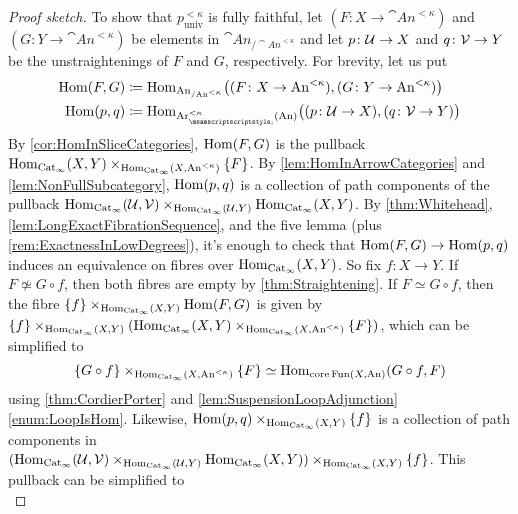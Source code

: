 \begin{proof}[Proof sketch]
	To show that $p_\mathrm{univ}^{<\kappa}$ is fully faithful, let $(F\colon X\rightarrow \cat{An}^{<\kappa})$ and $(G\colon Y\rightarrow \cat{An}^{<\kappa})$ be elements in $\cat{An}_{/\cat{An}^{<\kappa}}$ and let $p\colon \mathcal{U}\rightarrow X$ and $q\colon \mathcal{V}\rightarrow Y$ be the unstraightenings of $F$ and $G$, respectively. For brevity, let us put
	\begin{align*}
		\Hom(F,G)&\coloneqq \Hom_{\cat{An}_{/\cat{An}^{<\kappa}}}\lef((F\colon X\rightarrow \cat{An}^{<\kappa}),(G\colon Y\rightarrow \cat{An}^{<\kappa})\righ)\\
		\Hom(p,q)&\coloneqq \Hom_{\Ar_{ \pullbacksign \vphantom{^n} }^{<\kappa}(\cat{An})}\bigl((p\colon \Uu\rightarrow X),(q\colon \Vv\rightarrow Y)\bigr)
	\end{align*}
	By \cref{cor:HomInSliceCategories}, $\operatorname{Hom}(F,G)$ is the pullback $\operatorname{Hom}_{\mathrm{Cat}_\infty}\!\left(X,Y\right)\times_{\operatorname{Hom}_{\mathrm{Cat}_\infty}(X,\mathrm{An}^{<\kappa})}\{F\}$. By \cref{lem:HomInArrowCategories} and \cref{lem:NonFullSubcategory}, $\operatorname{Hom}(p,q)$ is a collection of path components of the pullback $\operatorname{Hom}_{\mathrm{Cat}_\infty}\!\left(\mathcal{U},\mathcal{V}\right)\times_{\operatorname{Hom}_{\mathrm{Cat}_\infty}(\mathcal{U},Y)}\operatorname{Hom}_{\mathrm{Cat}_\infty}\!\left(X,Y\right)$. By \cref{thm:Whitehead}, \cref{lem:LongExactFibrationSequence}, and the five lemma (plus \cref{rem:ExactnessInLowDegrees}), it's enough to check that $\operatorname{Hom}(F,G)\rightarrow \operatorname{Hom}(p,q)$ induces an equivalence on fibres over $\operatorname{Hom}_{\mathrm{Cat}_\infty}(X,Y)$. So fix $f\colon X\rightarrow Y$. If $F\not\simeq G\circ f$, then both fibres are empty by \cref{thm:Straightening}. If $F\simeq G\circ f$, then the fibre $\{f\}\times_{\operatorname{Hom}_{\mathrm{Cat}_\infty}(X,Y)}\operatorname{Hom}\!\left(F,G\right)$ is given by $\{f\}\times_{\operatorname{Hom}_{\mathrm{Cat}_\infty}(X,Y)}\left(\operatorname{Hom}_{\mathrm{Cat}_\infty}(X,Y\right)\times_{\operatorname{Hom}_{\mathrm{Cat}_\infty}(X,\mathrm{An}^{<\kappa})}\{F\})$, which can be simplified to
	\begin{equation*}
		\{G\circ f\}\times_{\operatorname{Hom}_{\mathrm{Cat}_\infty}(X,\mathrm{An}^{<\kappa})}\{F\}\simeq \operatorname{Hom}_{\operatorname{core} \operatorname{Fun}(X,\mathrm{An})}\!\left(G\circ f,F\right)
	\end{equation*}
	using \cref{thm:CordierPorter} and \cref{lem:SuspensionLoopAdjunction}\cref{enum:LoopIsHom}. Likewise, $\operatorname{Hom}(p,q)\times_{\operatorname{Hom}_{\mathrm{Cat}_\infty}(X,Y)}\{f\}$ is a collection of path components in $(\operatorname{Hom}_{\mathrm{Cat}_\infty}\!\left(\mathcal{U},\mathcal{V}\right)\times_{\operatorname{Hom}_{\mathrm{Cat}_\infty}(\mathcal{U},Y)}\operatorname{Hom}_{\mathrm{Cat}_\infty}\!\left(X,Y\right))\times_{\operatorname{Hom}_{\mathrm{Cat}_\infty}(X,Y)}\{f\}$. This pullback can be simplified to
	\begin{equation*}

\end{equation*}
\end{proof}

